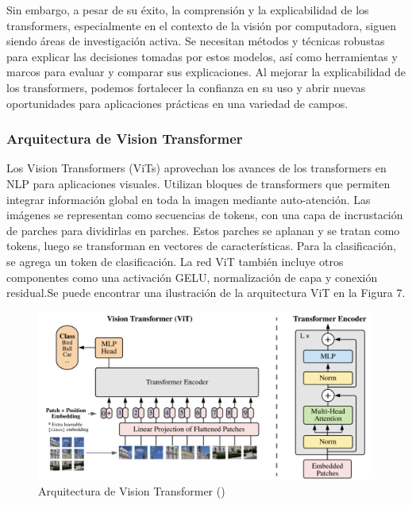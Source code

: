  Sin embargo, a pesar de su éxito, la comprensión y la explicabilidad de los transformers, especialmente en el contexto de la visión por computadora, siguen siendo áreas de investigación activa. Se necesitan métodos y técnicas robustas para explicar las decisiones tomadas por estos modelos, así como herramientas y marcos para evaluar y comparar sus explicaciones. Al mejorar la explicabilidad de los transformers, podemos fortalecer la confianza en su uso y abrir nuevas oportunidades para aplicaciones prácticas en una variedad de campos.
 
\subsubsection{ Arquitectura de Vision Transformer}
Los Vision Transformers (ViTs) aprovechan los avances de los transformers en NLP para aplicaciones visuales. Utilizan bloques de transformers que permiten integrar información global en toda la imagen mediante auto-atención. Las imágenes se representan como secuencias de tokens, con una capa de incrustación de parches para dividirlas en parches. Estos parches se aplanan y se tratan como tokens, luego se transforman en vectores de características. Para la clasificación, se agrega un token de clasificación. La red ViT también incluye otros componentes como una activación GELU, normalización de capa y conexión residual.Se puede encontrar una ilustración de la arquitectura ViT en la Figura 7.
  \begin{figure}[H]
  	\begin{center}
  		\includegraphics[width=1\textwidth]{2/figures/vt1.jpeg}
  		\caption{Arquitectura de Vision Transformer (\cite{tecnica1})}
  	\end{center}
  \end{figure}
 
